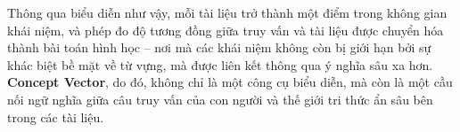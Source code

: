 Thông qua biểu diễn như vậy, mỗi tài liệu trở thành một điểm trong không gian khái niệm, và phép đo độ tương đồng giữa truy vấn và tài liệu được chuyển hóa thành bài toán hình học -- nơi mà các khái niệm không còn bị giới hạn bởi sự khác biệt bề mặt về từ vựng, mà được liên kết thông qua ý nghĩa sâu xa hơn. \textbf{Concept Vector}, do đó, không chỉ là một công cụ biểu diễn, mà còn là một cầu nối ngữ nghĩa giữa câu truy vấn của con người và thế giới tri thức ẩn sâu bên trong các tài liệu.
